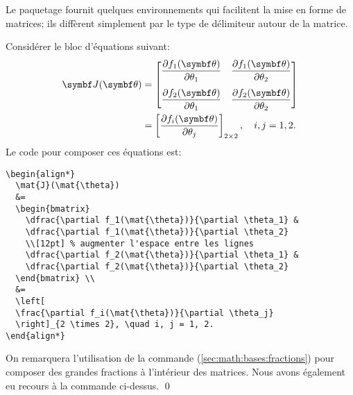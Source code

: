 \begin{exemple}
  \label{ex:math:matrices}
  Le paquetage  fournit quelques environnements qui
  facilitent la mise en forme de matrices; ils diffèrent simplement
  par le type de délimiteur autour de la matrice.

  Considérer le bloc d'équations suivant:
  \begin{align*}
    \mat{J}(\mat{\theta})
    &=
      \begin{bmatrix}
        \dfrac{\partial f_1(\mat{\theta})}{\partial \theta_1} &
        \dfrac{\partial f_1(\mat{\theta})}{\partial \theta_2} \\[12pt]
        \dfrac{\partial f_2(\mat{\theta})}{\partial \theta_1} &
        \dfrac{\partial f_2(\mat{\theta})}{\partial \theta_2}
      \end{bmatrix} \\
    &=
      \left[
      \frac{\partial f_i(\mat{\theta})}{\partial \theta_j}
      \right]_{2 \times 2}, \quad i, j = 1, 2.
  \end{align*}
  Le code pour composer ces équations est:
\begin{lstlisting}
\begin{align*}
  \mat{J}(\mat{\theta})
  &=
  \begin{bmatrix}
    \dfrac{\partial f_1(\mat{\theta})}{\partial \theta_1} &
    \dfrac{\partial f_1(\mat{\theta})}{\partial \theta_2}
    \\[12pt] % augmenter l'espace entre les lignes
    \dfrac{\partial f_2(\mat{\theta})}{\partial \theta_1} &
    \dfrac{\partial f_2(\mat{\theta})}{\partial \theta_2}
  \end{bmatrix} \\
  &=
  \left[
  \frac{\partial f_i(\mat{\theta})}{\partial \theta_j}
  \right]_{2 \times 2}, \quad i, j = 1, 2.
\end{align*}
\end{lstlisting}
  On remarquera l'utilisation de la commande \cmd{\dfrac}
  (\autoref{sec:math:bases:fractions}) pour composer des grandes
  fractions à l'intérieur des matrices. Nous avons également eu
  recours à la commande \cmdprint{\mat} ci-dessus. %
  \qed
\end{exemple}


